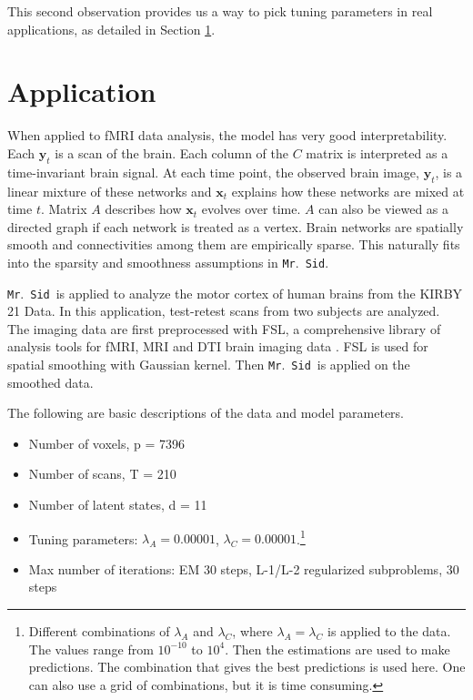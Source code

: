 \documentclass[fleqn]{article}
\let\oldref\ref
\renewcommand{\ref}[1]{(\oldref{#1})}
\newcommand{\mrsid}{{\sc \texttt{Mr}.~\texttt{Sid}}}
\begin{document}
This second observation provides us a way to pick tuning parameters in real applications, as detailed in Section \oldref{sec:application}.



\section{Application}
\label{sec:application}
When applied to fMRI data analysis, the model has very good interpretability. Each $\mathbf{y}_t$ is a scan of the brain. Each column of the $C$ matrix is interpreted as a time-invariant brain signal. At each time point, the observed brain image, $\mathbf{y}_t$, is a linear mixture of these networks and $\mathbf{x}_t$ explains how these networks are mixed at time $t$. Matrix $A$ describes how $\mathbf{x}_t$ evolves over time. $A$ can also be viewed as a directed graph if each network is treated as a vertex. Brain networks are spatially smooth and connectivities among them are empirically sparse. This naturally fits into the sparsity and smoothness assumptions in \mrsid.

\mrsid~is applied to analyze the motor cortex of human brains from the KIRBY 21 Data. In this application, test-retest scans from two subjects are analyzed. The imaging data are first preprocessed with FSL, a comprehensive library of analysis tools for fMRI, MRI and DTI brain imaging data \cite{smith2004advances}. FSL is used for spatial smoothing with Gaussian kernel. Then \mrsid~is applied on the smoothed data.

The following are basic descriptions of the data and model parameters.
\begin{itemize}[noitemsep, topsep=0pt]
\item Number of voxels, p = 7396
\item Number of scans, T = 210
\item Number of latent states, d = 11
\item Tuning parameters: $\lambda_A = 0.00001$, $\lambda_C = 0.00001$.\footnote{Different combinations of $\lambda_A$ and $\lambda_C$, where $\lambda_A = \lambda_C$ is applied to the data. The values range from $10^{-10}$ to $10^{4}$. Then the estimations are used to make predictions. The combination that gives the best predictions is used here. One can also use a grid of combinations, but it is time consuming.}
\item Max number of iterations: EM 30 steps, L-1/L-2 regularized subproblems, 30 steps
\end{itemize}
\end{document}
